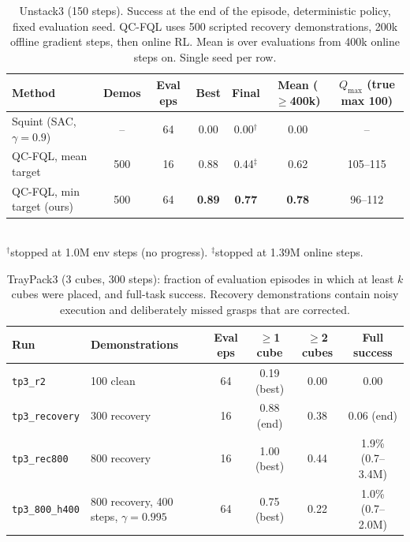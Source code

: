 
\begin{table}[t]
  \centering
  \caption{Unstack3 (150 steps). Success at the end of the episode, deterministic policy, fixed evaluation seed.
  QC-FQL uses 500 scripted recovery demonstrations, 200k offline gradient steps, then online RL.
  Mean is over evaluations from 400k online steps on. Single seed per row.}
  \label{tab:unstack3}
  \small
  \begin{tabular}{lcccccc}
    \toprule
    Method & Demos & Eval eps & Best & Final & Mean ($\geq$400k) & $Q_{\max}$ (true max 100) \\
    \midrule
    Squint (SAC, $\gamma{=}0.9$)            & --  & 64 & 0.00 & 0.00$^{\dagger}$ & 0.00 & -- \\
    QC-FQL, mean target                      & 500 & 16 & 0.88 & 0.44$^{\ddagger}$ & 0.62 & 105--115 \\
    QC-FQL, min target (ours)                & 500 & 64 & \textbf{0.89} & \textbf{0.77} & \textbf{0.78} & 96--112 \\
    \bottomrule
  \end{tabular}\\[2pt]
  {\footnotesize $^{\dagger}$stopped at 1.0M env steps (no progress). $^{\ddagger}$stopped at 1.39M online steps.}
\end{table}

\begin{table}[t]
  \centering
  \caption{TrayPack3 (3 cubes, 300 steps): fraction of evaluation episodes in which at least $k$ cubes were placed,
  and full-task success. Recovery demonstrations contain noisy execution and deliberately missed grasps that are corrected.}
  \label{tab:traypack3}
  \small
  \begin{tabular}{llcccc}
    \toprule
    Run & Demonstrations & Eval eps & $\geq$1 cube & $\geq$2 cubes & Full success \\
    \midrule
    \texttt{tp3\_r2}       & 100 clean              & 64 & 0.19 (best) & 0.00 & 0.00 \\
    \texttt{tp3\_recovery} & 300 recovery           & 16 & 0.88 (end)  & 0.38 & 0.06 (end) \\
    \texttt{tp3\_rec800}   & 800 recovery           & 16 & 1.00 (best) & 0.44 & 1.9\% (0.7--3.4M) \\
    \texttt{tp3\_800\_h400}& 800 recovery, 400 steps, $\gamma{=}0.995$ & 64 & 0.75 (best) & 0.22 & 1.0\% (0.7--2.0M) \\
    \bottomrule
  \end{tabular}
\end{table}

